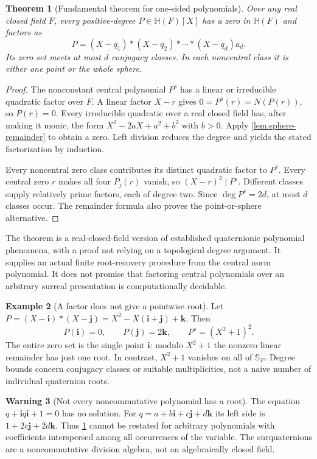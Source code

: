 \documentclass[11pt,letterpaper]{article}
\newtheorem{theorem}{Theorem}[section]
\theoremstyle{definition}
\newtheorem{example}[theorem]{Example}
\newtheorem{warning}[theorem]{Warning}
\newcommand{\HH}{\mathbb H}
\newcommand{\ii}{\mathbf i}
\newcommand{\jj}{\mathbf j}
\newcommand{\kk}{\mathbf k}
\newcommand{\Ss}{\mathbb S_F}
\begin{document}
\begin{theorem}[Fundamental theorem for one-sided polynomials]
\label{thm:fta}
Over any real closed field $F$, every positive-degree $P\in\HH(F)[X]$ has a
zero in $\HH(F)$ and factors as
\[
 P=(X-q_1)*(X-q_2)*\cdots*(X-q_d)a_d.
\]
Its zero set meets at most $d$ conjugacy classes. In each noncentral class it is
either one point or the whole sphere.
\end{theorem}
\begin{proof}
The nonconstant central polynomial $P^s$ has a linear or irreducible quadratic
factor over $F$. A linear factor $X-r$ gives
$0=P^s(r)=N(P(r))$, so $P(r)=0$. Every irreducible quadratic over a real closed
field has, after making it monic, the form
$X^2-2aX+a^2+b^2$ with $b>0$. Apply \cref{lem:sphere-remainder} to obtain a zero.
Left division reduces the degree and yields the stated factorization by
induction.

Every noncentral zero class contributes its distinct quadratic factor to
$P^s$. Every central zero $r$ makes all four $P_j(r)$ vanish, so
$(X-r)^2\mid P^s$. Different classes supply relatively prime factors, each of
degree two. Since $\deg P^s=2d$, at most $d$ classes occur. The remainder formula
also proves the point-or-sphere alternative.
\end{proof}
The theorem is a real-closed-field version of established quaternionic
polynomial phenomena, with a proof not relying on a topological degree argument.
It supplies an actual finite root-recovery procedure from the central norm
polynomial. It does not promise that factoring central polynomials over an
arbitrary surreal presentation is computationally decidable.

\begin{example}[A factor does not give a pointwise root]
\label{ex:camshaft}
Let $P=(X-\ii)*(X-\jj)=X^2-X(\ii+\jj)+\kk$. Then
\[
 P(\ii)=0,\qquad P(\jj)=2\kk,\qquad P^s=(X^2+1)^2.
\]
The entire zero set is the single point $\ii$: modulo $X^2+1$ the nonzero linear
remainder has just one root. In contrast, $X^2+1$ vanishes on all of $\Ss$.
Degree bounds concern conjugacy classes or suitable multiplicities, not a
naive number of individual quaternion roots.
\end{example}

\begin{warning}[Not every noncommutative polynomial has a root]
The equation $q+\ii q\ii+1=0$ has no solution. For
$q=a+b\ii+c\jj+d\kk$ its left side is $1+2c\jj+2d\kk$. Thus
\cref{thm:fta} cannot be restated for arbitrary polynomials with coefficients
interspersed among all occurrences of the variable. The surquaternions are a
noncommutative division algebra, not an algebraically closed field.
\end{warning}
\end{document}
